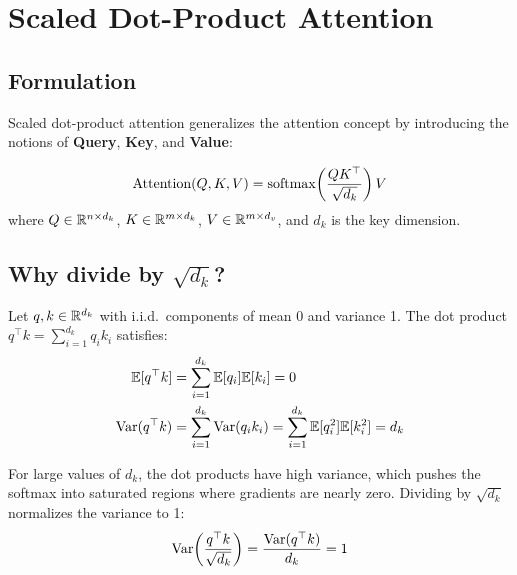 \section{Scaled Dot-Product Attention}
\label{sec:scaled-attention}

\subsection{Formulation}

Scaled dot-product attention \cite{vaswani2017attention} generalizes the
attention concept by introducing the notions of \textbf{Query},
\textbf{Key}, and \textbf{Value}:

\begin{keyformulas}[title=\textbf{Scaled Dot-Product Attention}]
\begin{equation}
\text{Attention}(Q, K, V) = \mathrm{softmax}\!\left(\frac{Q K^\top}{\sqrt{d_k}}\right) V
\label{eq:scaled-attention}
\end{equation}
where $Q \in \mathbb{R}^{n \times d_k}$, $K \in \mathbb{R}^{m \times d_k}$,
$V \in \mathbb{R}^{m \times d_v}$, and $d_k$ is the key dimension.
\end{keyformulas}

\subsection{Why divide by $\sqrt{d_k}$?}

\begin{theorem}
\label{thm:scaling}
Let $q, k \in \mathbb{R}^{d_k}$ with i.i.d.\ components of mean 0 and variance 1.
The dot product $q^\top k = \sum_{i=1}^{d_k} q_i k_i$ satisfies:
\begin{align}
\mathbb{E}[q^\top k] &= \sum_{i=1}^{d_k} \mathbb{E}[q_i] \mathbb{E}[k_i] = 0 \\
\mathrm{Var}(q^\top k) &= \sum_{i=1}^{d_k} \mathrm{Var}(q_i k_i)
= \sum_{i=1}^{d_k} \mathbb{E}[q_i^2]\mathbb{E}[k_i^2] = d_k
\end{align}

For large values of $d_k$, the dot products have high variance, which pushes
the softmax into saturated regions where gradients are nearly zero. Dividing
by $\sqrt{d_k}$ normalizes the variance to 1:
\begin{equation}
\mathrm{Var}\!\left(\frac{q^\top k}{\sqrt{d_k}}\right)
= \frac{\mathrm{Var}(q^\top k)}{d_k} = 1
\end{equation}
\end{theorem}


